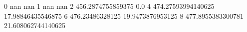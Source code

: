 0 nan nan
1 nan nan
2 456.2874755859375 0.0
4 474.27593994140625 17.98846435546875
6 476.23486328125 19.9473876953125
8 477.8955383300781 21.608062744140625
